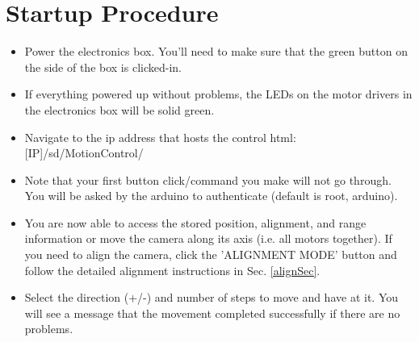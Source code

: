 \documentclass[11pt]{article}
\begin{document}
\section{Startup Procedure}

\begin{itemize}
	\item Power the electronics box.  You'll need to make sure that the green button on the side of the box is clicked-in.
	\item If everything powered up without problems, the LEDs on the motor drivers in the electronics box will be solid green. 
	\item Navigate to the ip address that hosts the control html: [IP]/sd/MotionControl/
	\item Note that your first button click/command you make will not go through.  
		You will be asked by the arduino to authenticate (default is root, arduino).
	\item You are now able to access the stored position, alignment, and range information or move the camera along its axis (i.e. all motors together).  
		If you need to align the camera, click the 'ALIGNMENT MODE' button and follow the detailed alignment instructions in Sec. \ref{alignSec}.
	\item Select the direction (+/-) and number of steps to move and have at it.  
		You will see a message that the movement completed successfully if there are no problems.
\end{itemize}
\end{document}
